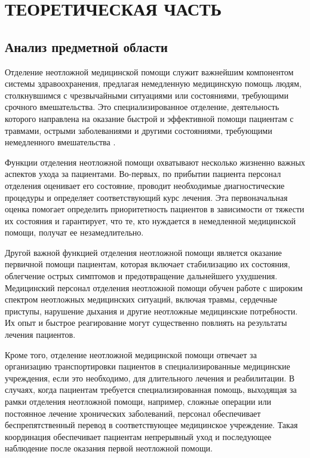 \section{ТЕОРЕТИЧЕСКАЯ ЧАСТЬ}
\subsection{Анализ предметной области}
Отделение неотложной медицинской помощи служит важнейшим компонентом системы здравоохранения, предлагая немедленную медицинскую помощь людям, столкнувшимся с чрезвычайными ситуациями или состояниями, требующими срочного вмешательства. Это специализированное отделение, деятельность которого направлена на оказание быстрой и эффективной помощи пациентам с травмами, острыми заболеваниями и другими состояниями, требующими немедленного вмешательства \cite{2}.

Функции отделения неотложной помощи охватывают несколько жизненно важных аспектов ухода за пациентами. Во-первых, по прибытии пациента персонал отделения оценивает его состояние, проводит необходимые диагностические процедуры и определяет соответствующий курс лечения. Эта первоначальная оценка помогает определить приоритетность пациентов в зависимости от тяжести их состояния и гарантирует, что те, кто нуждается в немедленной медицинской помощи, получат ее незамедлительно.

Другой важной функцией отделения неотложной помощи является оказание первичной помощи пациентам, которая включает стабилизацию их состояния, облегчение острых симптомов и предотвращение дальнейшего ухудшения. Медицинский персонал отделения неотложной помощи обучен работе с широким спектром неотложных медицинских ситуаций, включая травмы, сердечные приступы, нарушение дыхания и другие неотложные медицинские потребности. Их опыт и быстрое реагирование могут существенно повлиять на результаты лечения пациентов.

Кроме того, отделение неотложной медицинской помощи отвечает за организацию транспортировки пациентов в специализированные медицинские учреждения, если это необходимо, для длительного лечения и реабилитации. В случаях, когда пациентам требуется специализированная помощь, выходящая за рамки отделения неотложной помощи, например, сложные операции или постоянное лечение хронических заболеваний, персонал обеспечивает беспрепятственный перевод в соответствующее медицинское учреждение. Такая координация обеспечивает пациентам непрерывный уход и последующее наблюдение после оказания первой неотложной помощи.

